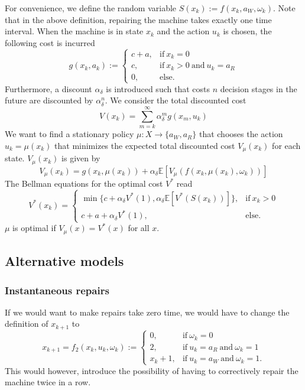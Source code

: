For convenience, we define the random variable $S(x_k):=f(x_k,a_W,\omega_k)$.
Note that in the above definition, repairing the machine takes exactly one time interval.
When the machine is in state $x_k$ and the action $u_k$ is chosen, the following cost is incurred
\begin{equation}
g(x_k,a_k):=\begin{cases}
c+a,&\text{if}\ x_k=0 \\
c,&\text{if}\ x_k>0\ \text{and}\ u_k=a_R \\
0,&\text{else}.
\end{cases}
\end{equation}
Furthermore, a discount $\alpha_\delta$ is introduced such that costs $n$ decision stages in the future are discounted by $\alpha_\delta^n$.
We consider the total discounted cost
\begin{equation}
V(x_k)=\sum\limits_{m=k}^\infty \alpha_\delta^mg(x_m,u_k)
\end{equation}
We want to find a stationary policy $\mu:X\rightarrow \{a_W,a_R\}$ that chooses the action $u_k=\mu(x_k)$ that minimizes the expected total discounted cost $V_\mu(x_k)$ for each state.
$V_\mu(x_k)$ is given by
$$
V_\mu(x_k)=g(x_k,\mu(x_k))+\alpha_\delta \mathbb{E}[V_\mu(f(x_k,\mu(x_k),\omega_k))]
$$
The Bellman equations for the optimal cost $V^*$ read
\begin{equation}
V^*(x_k)=\begin{cases}
\min\{c+\alpha_\delta V^*(1),\alpha_\delta \mathbb{E}[V^*(S(x_k))]\},&\text{if}\ x_k>0 \\
c+a+\alpha_\delta V^*(1),&\text{else.}
\end{cases}
\end{equation}
$\mu$ is optimal if $V_\mu(x)=V^*(x)$ for all $x$.

\subsection{Alternative models}
\subsubsection{Instantaneous repairs}
If we would want to make repairs take zero time, we would have to change the definition of $x_{k+1}$ to 
\begin{equation}
x_{k+1}=f_2(x_k,u_k,\omega_k):=\begin{cases}
0,&\text{if}\ \omega_k=0 \\
2,&\text{if}\ u_k=a_R\ \text{and}\ \omega_k=1\\
x_k+1,&\text{if}\ u_k=a_W\ \text{and}\ \omega_k=1.
\end{cases}
\end{equation}
This would however, introduce the possibility of having to correctively repair the machine twice in a row.

